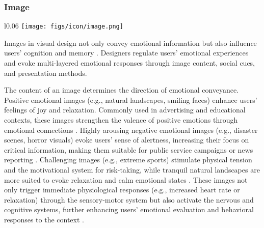\subsubsection{Image}
\begin{wrapfigure}{l}{0.06\textwidth}
  \vspace{-11pt} %
        \texttt{[image: figs/icon/image.png]}
\end{wrapfigure} 
Images in visual design not only convey emotional information but also influence users’ cognition and memory \cite{hanson2014happy, xie2017negative, van2015good}. Designers regulate users’ emotional experiences and evoke multi-layered emotional responses through image content, social cues, and presentation methods.

The content of an image determines the direction of emotional conveyance. Positive emotional images (e.g., natural landscapes, smiling faces) enhance users’ feelings of joy and relaxation. Commonly used in advertising and educational contexts, these images strengthen the valence of positive emotions through emotional connections \cite{hou2024emotional}. Highly arousing negative emotional images (e.g., disaster scenes, horror visuals) evoke users’ sense of alertness, increasing their focus on critical information, making them suitable for public service campaigns or news reporting \cite{pfeuffer122measuring}. Challenging images (e.g., extreme sports) stimulate physical tension and the motivational system for risk-taking, while tranquil natural landscapes are more suited to evoke relaxation and calm emotional states \cite{pfeuffer122measuring}.
These images not only trigger immediate physiological responses (e.g., increased heart rate or relaxation) through the sensory-motor system but also activate the nervous and cognitive systems, further enhancing users’ emotional evaluation and behavioral responses to the context \cite{phelps1998specifying, kensinger2007negative}.

